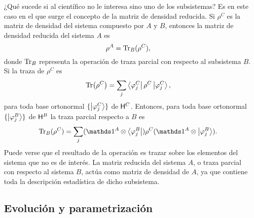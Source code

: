 ¿Qué sucede si al científico no le interesa sino uno de los subsistemas? Es en este caso en el que surge el concepto de la matriz de densidad reducida. Si $\rho^{C}$ es la matriz de densidad del sistema compuesto por $A$ y $B$, entonces la matriz de densidad reducida del sistema $A$ es
\begin{equation*}
    \rho^{A}=\Tr_{B}(\rho^{C}),
\end{equation*}
donde $\Tr_{B}$ representa la operación de traza parcial con respecto al subsistema $B$. Si la traza de $\rho^{C}$ es 
\begin{equation*}
    \Tr(\rho^{C})=\sum_{j}\bra{\varphi^{C}_{j}}\rho^{C}\ket{\varphi^{C}_{j}},
\end{equation*}
para toda base ortonormal $\{\ket{\varphi^{C}_{j}}\}$ de ${\sf H}^{C}$. Entonces, para toda base ortonormal $\{\ket{\varphi^{B}_{j}}\}$ de ${\sf H}^{B}$  la traza parcial respecto a $B$ es \cite{Hardy}
\begin{equation*}
    \Tr_{B}(\rho^{C})=\sum_{j}(\Id^{A}\otimes \bra{\varphi^{B}_{j}})\rho^{C}(\Id^{A}\otimes \ket{\varphi^{B}_{j}}).
\end{equation*}
Puede verse que el resultado de la operación es trazar sobre los elementos del sistema que no es de interés. La matriz reducida del sistema $A$, o traza parcial con respecto al sistema $B$, actúa como matriz de densidad de $A$, ya que contiene toda la descripción estadística de dicho subsistema.

\subsection{Evolución y parametrización}




